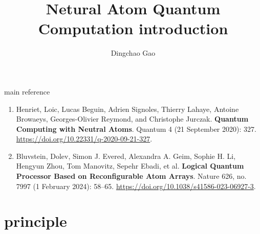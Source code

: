 \documentclass[18 pt]{beamer}
\title{Netural Atom Quantum Computation introduction}
\author[Gcc]{Dingchao Gao}
\institute[ISCAS]{Institute of Software Chinese Academy of Sciences}
\begin{document}
\begin{frame}[plain]
  \titlepage
\end{frame}
\begin{frame}{main reference}
  \begin{enumerate}
    \item Henriet, Loic, Lucas Beguin, Adrien Signoles, Thierry Lahaye, Antoine Browaeys, Georges-Olivier Reymond, and Christophe Jurczak. \textbf{Quantum Computing with Neutral Atoms}. Quantum 4 (21 September 2020): 327. \url{https://doi.org/10.22331/q-2020-09-21-327}.
    \item Bluvstein, Dolev, Simon J. Evered, Alexandra A. Geim, Sophie H. Li, Hengyun Zhou, Tom Manovitz, Sepehr Ebadi, et al. \textbf{Logical Quantum Processor Based on Reconfigurable Atom Arrays}. Nature 626, no. 7997 (1 February 2024): 58–65. \url{https://doi.org/10.1038/s41586-023-06927-3}.
  \end{enumerate}
\end{frame}
\section{principle}
\end{document}
